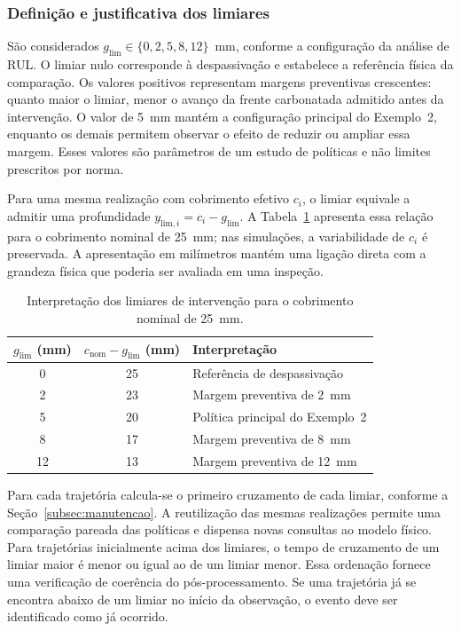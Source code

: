 \subsubsection{Definição e justificativa dos limiares}

São considerados $g_{\mathrm{lim}}\in\{0,2,5,8,12\}$~mm, conforme a configuração da análise de RUL. O limiar nulo corresponde à despassivação e estabelece a referência física da comparação. Os valores positivos representam margens preventivas crescentes: quanto maior o limiar, menor o avanço da frente carbonatada admitido antes da intervenção. O valor de 5~mm mantém a configuração principal do Exemplo~2, enquanto os demais permitem observar o efeito de reduzir ou ampliar essa margem. Esses valores são parâmetros de um estudo de políticas e não limites prescritos por norma.

Para uma mesma realização com cobrimento efetivo $c_i$, o limiar equivale a admitir uma profundidade $y_{\mathrm{lim},i}=c_i-g_{\mathrm{lim}}$. A Tabela~\ref{tab:ex3_limiares} apresenta essa relação para o cobrimento nominal de 25~mm; nas simulações, a variabilidade de $c_i$ é preservada. A apresentação em milímetros mantém uma ligação direta com a grandeza física que poderia ser avaliada em uma inspeção.

\begin{table}[htbp]
\centering
\caption{Interpretação dos limiares de intervenção para o cobrimento nominal de 25~mm.}
\label{tab:ex3_limiares}
\begin{tabular}{ccl}
\toprule
$g_{\mathrm{lim}}$ (mm) & $c_{\mathrm{nom}}-g_{\mathrm{lim}}$ (mm) & Interpretação \\
\midrule
0 & 25 & Referência de despassivação \\
2 & 23 & Margem preventiva de 2~mm \\
5 & 20 & Política principal do Exemplo~2 \\
8 & 17 & Margem preventiva de 8~mm \\
12 & 13 & Margem preventiva de 12~mm \\
\bottomrule
\end{tabular}
\end{table}

Para cada trajetória calcula-se o primeiro cruzamento de cada limiar, conforme a Seção~\ref{subsec:manutencao}. A reutilização das mesmas realizações permite uma comparação pareada das políticas e dispensa novas consultas ao modelo físico. Para trajetórias inicialmente acima dos limiares, o tempo de cruzamento de um limiar maior é menor ou igual ao de um limiar menor. Essa ordenação fornece uma verificação de coerência do pós-processamento. Se uma trajetória já se encontra abaixo de um limiar no início da observação, o evento deve ser identificado como já ocorrido.

